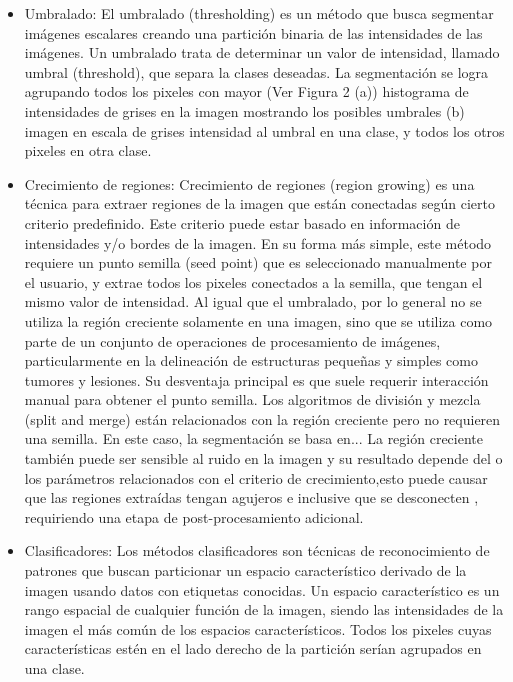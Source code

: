 \begin{itemize}
\item Umbralado: El umbralado (thresholding) es un m\'etodo que busca segmentar im\'agenes escalares creando una partici\'on binaria de las intensidades de las im\'agenes. Un umbralado trata de determinar un valor de intensidad, llamado umbral (threshold), que
separa la clases deseadas. La segmentaci\'on se logra agrupando todos los pixeles con mayor (Ver Figura 2 (a)) histograma de intensidades de grises en la imagen mostrando los posibles umbrales (b) imagen en escala de grises intensidad al umbral en una clase, y todos los otros pixeles en otra clase.
\item Crecimiento de regiones: Crecimiento de regiones (region growing) es una t\'ecnica para extraer regiones de la imagen que est\'an conectadas seg\'un cierto criterio predefinido. Este criterio puede estar basado en informaci\'on de intensidades y/o bordes de la imagen. En su forma más simple, este m\'etodo requiere un punto semilla (seed point) que es seleccionado manualmente por el usuario, y extrae todos los pixeles conectados a la semilla, que tengan el mismo valor de intensidad. Al igual que el umbralado, por lo general no se utiliza la regi\'on creciente solamente en una imagen, sino que se utiliza como parte de un conjunto de operaciones de procesamiento de im\'agenes, particularmente en la delineaci\'on de estructuras pequeñas y simples como tumores y lesiones. Su desventaja principal es que suele requerir interacci\'on manual para obtener el punto semilla. Los algoritmos de divisi\'on y mezcla (split and merge) están relacionados con la regi\'on creciente pero no requieren una semilla. En este caso, la segmentación se basa en... 
La regi\'on creciente tambi\'en puede ser sensible al ruido en la imagen y su resultado depende del o los parámetros relacionados con el criterio de crecimiento,esto puede causar que las regiones extra\'idas tengan agujeros e inclusive que se desconecten , requiriendo una etapa de post-procesamiento adicional.
\item Clasificadores: Los m\'etodos clasificadores son t\'ecnicas de reconocimiento de patrones que buscan particionar un espacio caracter\'istico derivado de la imagen usando datos con etiquetas conocidas. Un espacio caracter\'istico es un rango espacial de cualquier funci\'on de la imagen, siendo las intensidades de la imagen el m\'as com\'un de los espacios caracter\'isticos. Todos los pixeles cuyas caracter\'isticas est\'en en el lado derecho de la partici\'on ser\'ian agrupados en una clase.

\end{itemize}
